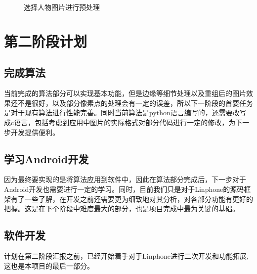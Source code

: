 \documentclass[14pt]{extarticle}
\newcommand{\<}{\langle}
\renewcommand{\>}{\rangle}
\theoremstyle{definition}
\begin{document}
\begin{itemize}
\begin{figure}[H]
{    }

    \caption{选择人物图片进行预处理}
\end{figure}
\end{itemize}

\section{第二阶段计划}
\subsection{完成算法}
\par{\qquad 当前完成的算法部分可以实现基本功能，但是边缘等细节处理以及重组后的图片效果还不是很好，以及部分像素点的处理会有一定的误差，所以下一阶段的首要任务是对于现有算法进行性能完善。同时当前算法是python语言编写的，还需要改写成c语言，包括考虑到应用中图片的实际格式对部分代码进行一定的修改，为下一步开发提供便利。}
\subsection{学习Android开发}
\par{\qquad 因为最终要实现的是将算法应用到软件中，因此在算法部分完成后，下一步对于Android开发也需要进行一定的学习。同时，目前我们只是对于Linphone的源码框架有了一些了解，在开发之前还需要更为细致地对其分析，对各部分功能有更好的把握。这是在下个阶段中难度最大的部分，也是项目完成中最为关键的基础。}
\subsection{软件开发}
\par{\qquad 计划在第二阶段汇报之前，已经开始着手对于Linphone进行二次开发和功能拓展,这也是本项目的最后一部分。}
\end{document}
